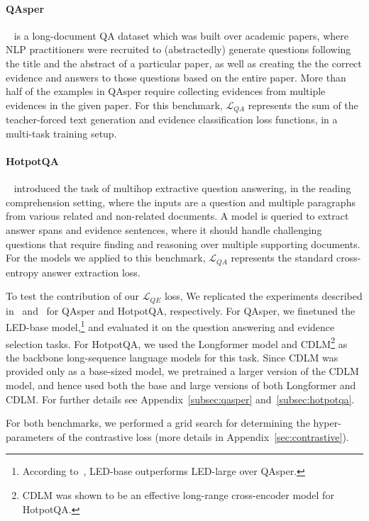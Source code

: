 \paragraph{QAsper}~\cite{dasigi-etal-2021-dataset} is a long-document QA dataset which was built over academic papers, where NLP practitioners were recruited to (abstractedly) generate questions following the title and the abstract of a particular paper, as well as creating the the correct evidence and answers to those questions based on the entire paper. More than half of the examples in QAsper require collecting evidences from multiple evidences in the given paper. For this benchmark, $\mathcal{L}_{QA}$ represents the sum of the teacher-forced text generation and evidence classification loss functions, in a multi-task training setup.


\paragraph{HotpotQA}~\cite{yang-etal-2018-hotpotqa} introduced the task of multihop extractive question answering, in the reading comprehension setting, where the inputs are a question and multiple paragraphs from various related and non-related documents. A model is queried to extract answer spans and evidence sentences, where it should handle challenging questions that require finding and reasoning over multiple supporting documents. For the models we applied to this benchmark, $\mathcal{L}_{QA}$ represents the standard cross-entropy answer extraction loss.

To test the contribution of our $\mathcal{L}_{QE}$ loss, We replicated the experiments described in~\citet{dasigi-etal-2021-dataset} and~\citet{caciularu-etal-2021-cdlm-cross} for QAsper and HotpotQA, respectively. For QAsper, we finetuned the LED-base model,\footnote{According to~\citet{dasigi-etal-2021-dataset}, LED-base outperforms LED-large over QAsper.} and evaluated it on the question answering and evidence selection tasks. For HotpotQA, we used the Longformer model and CDLM\footnote{CDLM was shown to be an effective long-range cross-encoder model for HotpotQA.} as the backbone long-sequence language models for this task. Since CDLM was provided only as a base-sized model, we pretrained a larger version of the CDLM model, and hence used both the base and large versions of both Longformer and CDLM. For further details see Appendix~\ref{subsec:qasper} and~\ref{subsec:hotpotqa}.

For both benchmarks, we performed a grid search for determining the hyper-parameters of the contrastive loss (more details in Appendix~\ref{sec:contrastive}).
